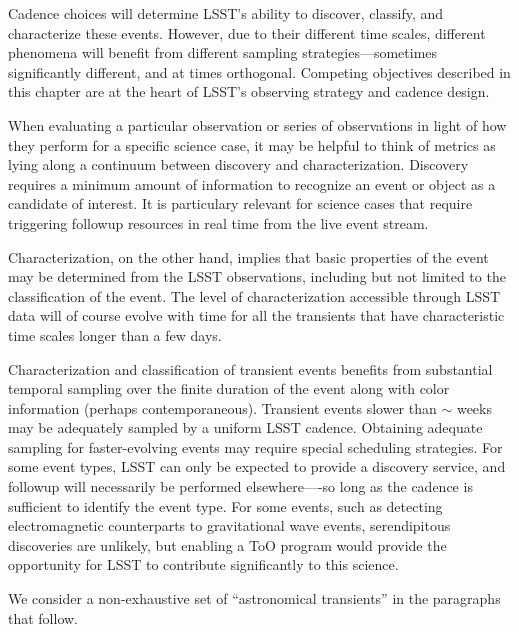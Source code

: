 Cadence choices will determine LSST's ability to discover, classify, and
characterize these events. However, due to their different time scales, 
different phenomena will benefit from different sampling 
strategies---sometimes
significantly different, and at times orthogonal.  Competing objectives
described in this chapter are at the heart of LSST's observing strategy and
cadence design.

When evaluating a particular observation or series of observations in
light of how they perform for a specific science case, it may be
helpful to think of metrics as lying along a continuum between
discovery and characterization. Discovery requires a minimum amount of
information to recognize an event or object as a candidate of
interest.  It is particulary relevant for science cases that require
triggering followup resources in real time from the live event stream.

Characterization, on the other hand, implies
that basic properties of the event may be determined from the
LSST observations, including but not limited to the classification of
the event. The level of characterization accessible through LSST data
will of course evolve with time for all the transients that have
characteristic time scales longer than a few days.

Characterization and classification of transient events 
benefits from substantial temporal sampling over the finite duration of the
event along with color information (perhaps contemporaneous). 
Transient events slower than $\sim$ weeks may be adequately sampled by
a uniform LSST cadence.  Obtaining adequate sampling for faster-evolving
events may require special scheduling
strategies.  For some event types, LSST can only be expected to
provide a discovery service, and followup will necessarily be
performed elsewhere----so long as the cadence is sufficient to identify the
event type.
For some events, such as detecting electromagnetic counterparts to
gravitational wave events,
serendipitous discoveries are unlikely, but
enabling a ToO program would provide the opportunity for LSST to
contribute significantly to this science.


We consider a non-exhaustive set of ``astronomical transients'' in the
paragraphs that follow.

